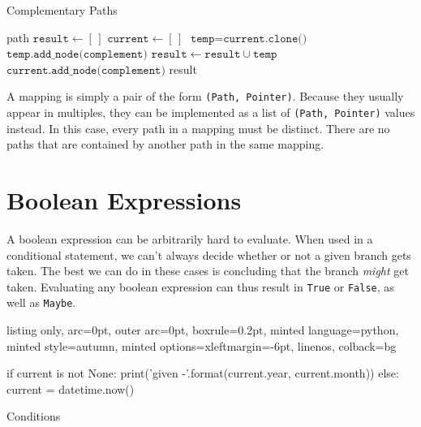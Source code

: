 \documentclass[a4paper, 16pt, oneside]{Thesis}
\begin{document}
\begin{algorithm}
    \caption{Complementary Paths}\label{alg:complement}
    \begin{algorithmic}[1]
         {path}
          \State $\texttt{result} \gets [\,]$
          \State $\texttt{current} \gets [\,]$
                \State $\texttt{temp} = \texttt{current.clone()}$
                \State $\texttt{temp.add\_node(complement)}$
                \State $\texttt{result} \gets \texttt{result} \cup \texttt{temp}$
              \EndFor
            \EndIf
            \State $\texttt{current.add\_node(complement)}$
          \EndFor
          \Return result
        \EndFunction
    \end{algorithmic}
\end{algorithm}

A mapping is simply a pair of the form \texttt{(Path,\ Pointer)}.
Because they usually appear in multiples, they can be implemented as a
list of \texttt{(Path,\ Pointer)} values instead. In this case, every
path in a mapping must be distinct. There are no paths that are
contained by another path in the same mapping.

\section{Boolean Expressions}\label{boolean-expressions}

A boolean expression can be arbitrarily hard to evaluate. When used in a
conditional statement, we can't always decide whether or not a given
branch gets taken. The best we can do in these cases is concluding that
the branch \emph{might} get taken. Evaluating any boolean expression can
thus result in \texttt{True} or \texttt{False}, as well as
\texttt{Maybe}.

\begin{code}
  \begin{tcblisting}{listing only, 
  arc=0pt,
  outer arc=0pt, 
  boxrule=0.2pt,
  minted language=python,
  minted style=autumn,
  minted options={xleftmargin=-6pt, linenos},
  colback=bg}

if current is not None:
  print('given {}-{}'.format(current.year, current.month))
else:
  current = datetime.now()

\end{tcblisting}
\caption{Conditions} \label{smp:conds}
\end{code}
\end{document}
